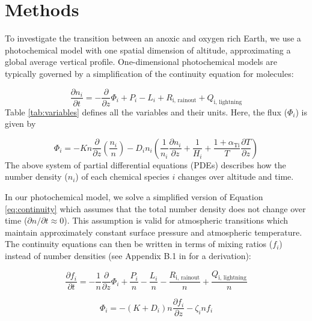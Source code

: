 \section{Methods}

To investigate the transition between an anoxic and oxygen rich Earth, we use a photochemical model with one spatial dimension of altitude, approximating a global average vertical profile. One-dimensional photochemical models are typically governed by a simplification of the continuity equation for molecules:

\begin{equation} \label{eq:continuity}
  \frac{\partial n_{i}}{\partial t} = - \frac{\partial}{\partial z}\Phi_{i} + P_{i} - L_{i} + R_{\text{i,\ rainout}} + Q_{\text{i,\ lightning}}
\end{equation}
Table \ref{tab:variables} defines all the variables and their units. Here, the flux ($\Phi_{i}$) is given by

\begin{equation} 
  \Phi_{i} = - Kn\frac{\partial}{\partial z}\left( \frac{n_{i}}{n} \right) - D_{i}n_{i}\left( \frac{1}{n_{i}}\frac{\partial n_{i}}{\partial z} + \frac{1}{H_{i}} + \frac{1 + \alpha_{\text{Ti}}}{T}\frac{\partial T}{\partial z} \right)
\end{equation}
The above system of partial differential equations (PDEs) describes how the number density ($n_{i}$) of each chemical species $i$ changes over altitude and time.

In our photochemical model, we solve a simplified version of Equation \eqref{eq:continuity} which assumes that the total number density does not change over time ($\partial n / \partial t \approx 0$). This assumption is valid for atmospheric transitions which maintain approximately constant surface pressure and atmospheric temperature. The continuity equations can then be written in terms of mixing ratios ($f_{i}$) instead of number densities (see Appendix B.1 in \citet{Catling_2017} for a derivation):

\begin{equation} \label{eq:continuity_simple}
  \frac{\partial f_{i}}{\partial t} = - \frac{1}{n}\frac{\partial}{\partial z}\Phi_{i} + \frac{P_{i}}{n} - \frac{L_{i}}{n} - \frac{R_{\text{i,\ rainout}}}{n} + \frac{Q_{\text{i,\ lightning}}}{n}
\end{equation}

\begin{equation}
  \Phi_{i} = - \left( K + D_{i} \right)n\frac{\partial f_{i}}{\partial z} - \zeta_{i}nf_{i}
\end{equation}

